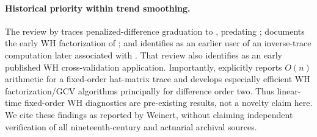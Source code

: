 \paragraph{Historical priority within trend smoothing.}
The review by \citet{weinert2007} traces penalized-difference
graduation to \citet{bohlmann1899}, predating
\citet{whittaker1923}; documents the early WH factorization
of \citet{henderson1925}; and identifies \citet{spoerl1943}
as an earlier user of an inverse-trace computation later
associated with \citet{takahashi1973}. That review also identifies \citet{brooks1988}
as an early published WH cross-validation application.
Importantly, \citet[Sec.~1, p.~961]{weinert2007} explicitly
reports $O(n)$ arithmetic for a fixed-order hat-matrix trace
and develops especially efficient WH factorization/GCV
algorithms principally for difference order two. Thus
linear-time fixed-order WH diagnostics are pre-existing
results, not a novelty claim here. We cite these findings as reported
by Weinert, without claiming independent verification
of all nineteenth-century and actuarial archival sources.
